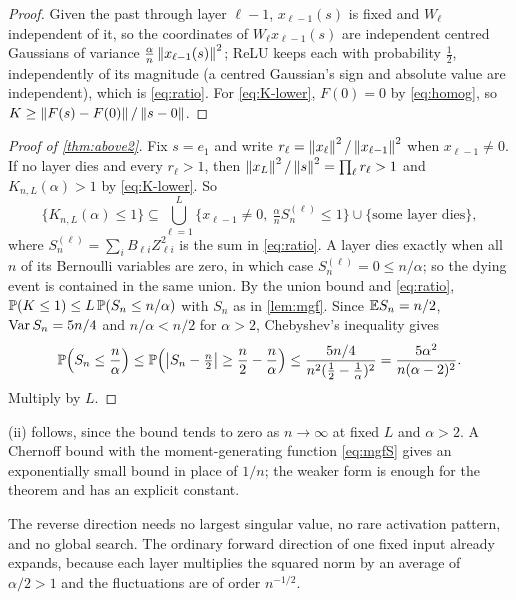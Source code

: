 \begin{proof}
Given the past through layer $\ell-1$, $x_{\ell-1}(s)$ is fixed and $W_\ell$ independent of it, so the coordinates of $W_\ell x_{\ell-1}(s)$ are independent centred Gaussians of variance $\frac\alpha n\left\lVert x_{\ell-1}(s)\right\rVert^2$; ReLU keeps each with probability $\tfrac12$, independently of its magnitude (a centred Gaussian's sign and absolute value are independent), which is \cref{eq:ratio}. For \cref{eq:K-lower}, $F(0)=0$ by \cref{eq:homog}, so $K\ge\left\lVert F(s)-F(0)\right\rVert/\left\lVert s-0\right\rVert$.
\end{proof}

\begin{proof}[Proof of \cref{thm:above2}]
Fix $s=e_1$ and write $r_\ell=\left\lVert x_\ell\right\rVert^2/\left\lVert x_{\ell-1}\right\rVert^2$ when $x_{\ell-1}\ne0$. If no layer dies and every $r_\ell>1$, then $\left\lVert x_L\right\rVert^2/\left\lVert s\right\rVert^2=\prod_\ell r_\ell>1$ and $K_{n,L}(\alpha)>1$ by \cref{eq:K-lower}. So
\[
\{K_{n,L}(\alpha)\le1\}\subseteq\bigcup_{\ell=1}^L\{x_{\ell-1}\ne0,\ \tfrac\alpha nS^{(\ell)}_n\le1\}\cup\{\text{some layer dies}\},
\]
where $S^{(\ell)}_n=\sum_iB_{\ell i}Z_{\ell i}^2$ is the sum in \cref{eq:ratio}. A layer dies exactly when all $n$ of its Bernoulli variables are zero, in which case $S^{(\ell)}_n=0\le n/\alpha$; so the dying event is contained in the same union. By the union bound and \cref{eq:ratio}, $\mathbb{P}(K\le1)\le L\,\mathbb{P}(S_n\le n/\alpha)$ with $S_n$ as in \cref{lem:mgf}. Since $\mathbb{E} S_n=n/2$, $\operatorname{Var} S_n=5n/4$ and $n/\alpha<n/2$ for $\alpha>2$, Chebyshev's inequality gives
\[
\mathbb{P}\Bigl(S_n\le\frac n\alpha\Bigr)\le\mathbb{P}\Bigl(\left\lvert S_n-\tfrac n2\right\rvert\ge\frac n2-\frac n\alpha\Bigr)\le\frac{5n/4}{n^2(\frac12-\frac1\alpha)^2}=\frac{5\alpha^2}{n(\alpha-2)^2}.
\]
Multiply by $L$.
\end{proof}

(ii) follows, since the bound tends to zero as $n\to\infty$ at fixed $L$ and $\alpha>2$. A Chernoff bound with the moment-generating function \cref{eq:mgfS} gives an exponentially small bound in place of $1/n$; the weaker form is enough for the theorem and has an explicit constant.

\begin{remark}
The reverse direction needs no largest singular value, no rare activation pattern, and no global search. The ordinary forward direction of one fixed input already expands, because each layer multiplies the squared norm by an average of $\alpha/2>1$ and the fluctuations are of order $n^{-1/2}$.
\end{remark}


